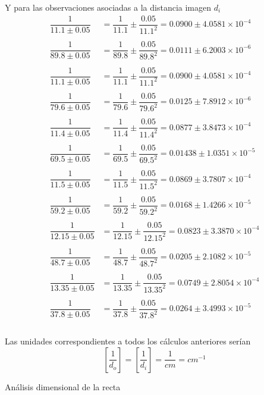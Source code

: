 \documentclass[a4paper, 10pt]{article}
\begin{document}
	Y para las observaciones asociadas a la distancia imagen $d_i$
	\begin{align*}
		\dfrac{1}{11.1\pm 0.05}&=\dfrac{1}{11.1}\pm\dfrac{0.05}{11.1^2}=0.0900\pm4.0581\times10^{-4}\\\\
		\dfrac{1}{89.8\pm 0.05}&=\dfrac{1}{89.8}\pm\dfrac{0.05}{89.8^2}=0.0111\pm6.2003\times10^{-6}\\\\
		\dfrac{1}{11.1\pm 0.05}&=\dfrac{1}{11.1}\pm\dfrac{0.05}{11.1^2}=0.0900\pm4.0581\times10^{-4}\\\\
		\dfrac{1}{79.6\pm 0.05}&=\dfrac{1}{79.6}\pm\dfrac{0.05}{79.6^2}=0.0125\pm7.8912\times10^{-6}\\\\
		\dfrac{1}{11.4\pm 0.05}&=\dfrac{1}{11.4}\pm\dfrac{0.05}{11.4^2}=0.0877\pm3.8473\times10^{-4}\\\\
		\dfrac{1}{69.5\pm 0.05}&=\dfrac{1}{69.5}\pm\dfrac{0.05}{69.5^2}=0.01438\pm1.0351\times10^{-5}\\\\
		\dfrac{1}{11.5\pm 0.05}&=\dfrac{1}{11.5}\pm\dfrac{0.05}{11.5^2}=0.0869\pm3.7807\times10^{-4}\\\\
		\dfrac{1}{59.2\pm 0.05}&=\dfrac{1}{59.2}\pm\dfrac{0.05}{59.2^2}=0.0168\pm1.4266\times10^{-5}\\\\
		\dfrac{1}{12.15\pm 0.05}&=\dfrac{1}{12.15}\pm\dfrac{0.05}{12.15^2}=0.0823\pm3.3870\times10^{-4}\\\\
		\dfrac{1}{48.7\pm 0.05}&=\dfrac{1}{48.7}\pm\dfrac{0.05}{48.7^2}=0.0205\pm2.1082\times10^{-5}\\\\
		\dfrac{1}{13.35\pm 0.05}&=\dfrac{1}{13.35}\pm\dfrac{0.05}{13.35^2}=0.0749\pm2.8054\times10^{-4}\\\\
		\dfrac{1}{37.8\pm 0.05}&=\dfrac{1}{37.8}\pm\dfrac{0.05}{37.8^2}=0.0264\pm3.4993\times10^{-5}\\\\
	\end{align*}

	Las unidades correspondientes a todos los cálculos anteriores serían $$\left[\dfrac{1}{d_o}\right]=\left[\dfrac{1}{d_i}\right]=\dfrac{1}{cm}=cm^{-1}$$
	
	\newpage
	Análisis dimensional de la recta 
	
\end{document}
